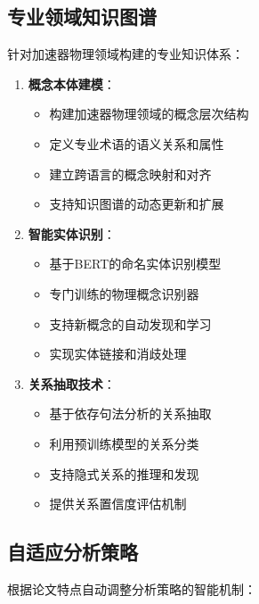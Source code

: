 \documentclass[12pt,a4paper]{article}
\begin{document}
\subsection{专业领域知识图谱}
针对加速器物理领域构建的专业知识体系：

\begin{enumerate}
    \item \textbf{概念本体建模}：
        \begin{itemize}
            \item 构建加速器物理领域的概念层次结构
            \item 定义专业术语的语义关系和属性
            \item 建立跨语言的概念映射和对齐
            \item 支持知识图谱的动态更新和扩展
        \end{itemize}
    
    \item \textbf{智能实体识别}：
        \begin{itemize}
            \item 基于BERT的命名实体识别模型
            \item 专门训练的物理概念识别器
            \item 支持新概念的自动发现和学习
            \item 实现实体链接和消歧处理
        \end{itemize}
    
    \item \textbf{关系抽取技术}：
        \begin{itemize}
            \item 基于依存句法分析的关系抽取
            \item 利用预训练模型的关系分类
            \item 支持隐式关系的推理和发现
            \item 提供关系置信度评估机制
        \end{itemize}
\end{enumerate}

\subsection{自适应分析策略}
根据论文特点自动调整分析策略的智能机制：
\end{document}
